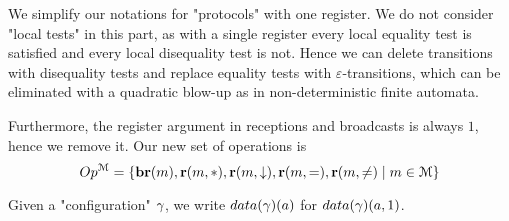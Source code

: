 
	We simplify our notations for "protocols" with one register.
	We do not consider "local tests" in this part, as with a single register every local equality test is satisfied and every local disequality test is not.
	Hence we can delete transitions with disequality tests and replace equality tests with $\varepsilon$-transitions, which can be eliminated with a quadratic blow-up as in non-deterministic finite automata.
	
	Furthermore, the register argument in receptions and broadcasts is always $1$, hence we remove it.
	Our new set of operations is 
	\[
	Op^{\mathcal{M}} = \{\textbf{br}(m), \textbf{r}(m, {*}), \textbf{r}(m, \downarrow), \textbf{r}(m, {=}), \textbf{r}(m, {\ne}) \mid m \in \mathcal{M}\}
	\]
	
	Given a "configuration" $\gamma$, we write $\data{\config}(a)$ for $\data{\config}(a,1)$. 




